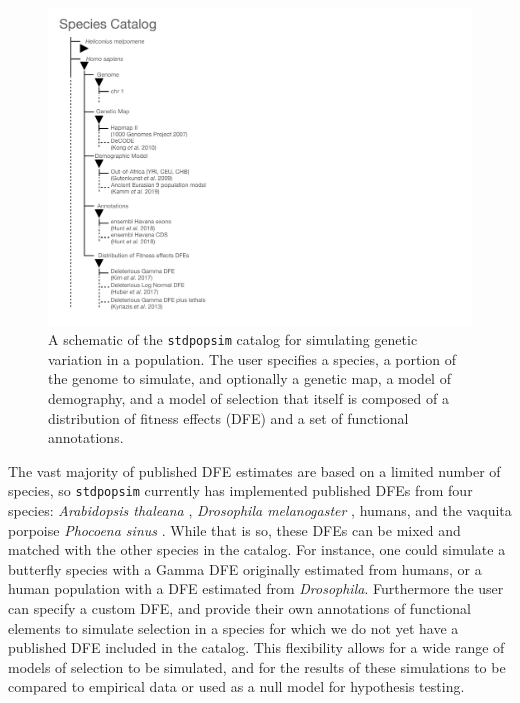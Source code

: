\documentclass[hidelinks]{article}
\newcommand{\stdpopsim}{\texttt{stdpopsim}\xspace}
\begin{document}
    \begin{figure}
        \vspace{-0.0cm}
        \includegraphics[width=\linewidth]{figures/schematics/catalog.pdf}
        \caption{\label{fig:schematic}
        A schematic of the \stdpopsim catalog for simulating genetic variation
        in a population. The user specifies a species, a portion of the genome to simulate,
        and optionally a genetic map, a model of demography, and a model of selection that 
        itself is composed of a distribution of fitness effects (DFE) and a set of functional
        annotations.}
    \end{figure}

    The vast majority of published DFE estimates are based on a limited number of species,
    so \stdpopsim currently has implemented published DFEs from
    four species: \textit{Arabidopsis thaleana} \citep{huber2018gene}, \textit{Drosophila melanogaster} \citep{ragsdale2016triallelic,huber2017determining},
    humans, and the vaquita porpoise \textit{Phocoena sinus} \citep{robinson2022critically}.
    While that is so, these DFEs can be mixed and matched with the other species
    in the catalog. For instance, one could simulate a butterfly species with a Gamma DFE originally
    estimated from humans, or a human population with a DFE estimated from \textit{Drosophila}.
    Furthermore the user can specify a custom DFE, and provide their own annotations
    of functional elements to simulate selection in a species for which we do not yet have 
    a published DFE included in the catalog. This flexibility allows for a wide range of
    models of selection to be simulated, and for the results of these simulations to be
    compared to empirical data or used as a null model for hypothesis testing.
   
\end{document}
